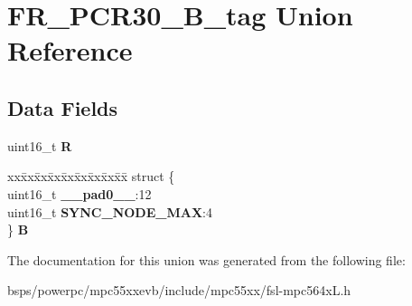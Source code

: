 \hypertarget{unionFR__PCR30__16B__tag}{}\section{F\+R\+\_\+\+P\+C\+R30\+\_\+B\+\_\+tag Union Reference}
\label{unionFR__PCR30__16B__tag}
\subsection*{Data Fields}
\begin{DoxyCompactItemize}
\item 
\mbox{\label{unionFR__PCR30__16B__tag_a9c20615ba41971ab583d452d6b1107cd}} 
uint16\+\_\+t {\bfseries R}
\item 
\mbox{\label{unionFR__PCR30__16B__tag_ac60e58eabe1b0975c2416c7abfe00240}} 
\begin{tabbing}
xx\=xx\=xx\=xx\=xx\=xx\=xx\=xx\=xx\=\kill
struct \{\\
\>uint16\_t {\bfseries \_\_pad0\_\_}:12\\
\>uint16\_t {\bfseries SYNC\_NODE\_MAX}:4\\
\} {\bfseries B}\\

\end{tabbing}\end{DoxyCompactItemize}


The documentation for this union was generated from the following file\+:\begin{DoxyCompactItemize}
\item 
bsps/powerpc/mpc55xxevb/include/mpc55xx/fsl-\/mpc564x\+L.\+h\end{DoxyCompactItemize}

